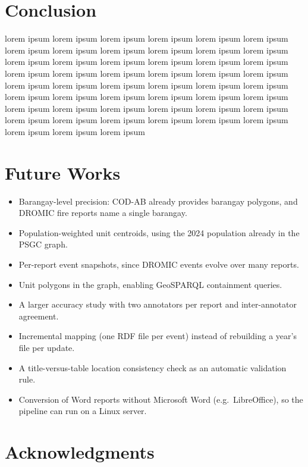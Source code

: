 \documentclass[acmtog]{acmart}
\begin{document}
\section{Conclusion}

lorem ipsum  lorem ipsum  lorem ipsum  lorem ipsum  lorem ipsum  lorem ipsum  lorem ipsum  lorem ipsum  lorem ipsum  lorem ipsum  lorem ipsum  lorem ipsum  lorem ipsum  lorem ipsum  lorem ipsum  lorem ipsum  lorem ipsum  lorem ipsum  lorem ipsum  lorem ipsum  lorem ipsum  lorem ipsum  lorem ipsum  lorem ipsum  lorem ipsum  lorem ipsum  lorem ipsum  lorem ipsum  lorem ipsum  lorem ipsum  lorem ipsum  lorem ipsum  lorem ipsum  lorem ipsum  lorem ipsum  lorem ipsum  lorem ipsum  lorem ipsum  lorem ipsum  lorem ipsum  lorem ipsum  lorem ipsum  lorem ipsum  lorem ipsum  lorem ipsum  lorem ipsum  lorem ipsum  lorem ipsum  lorem ipsum  lorem ipsum  lorem ipsum  

\section{Future Works}

\begin{itemize}
\item Barangay-level precision: COD-AB already provides barangay polygons, and DROMIC fire reports
  name a single barangay.
\item Population-weighted unit centroids, using the 2024 population already in the PSGC graph.
\item Per-report event snapshots, since DROMIC events evolve over many reports.
\item Unit polygons in the graph, enabling GeoSPARQL containment queries.
\item A larger accuracy study with two annotators per report and inter-annotator agreement.
\item Incremental mapping (one RDF file per event) instead of rebuilding a year's file per update.
\item A title-versus-table location consistency check as an automatic validation rule.
\item Conversion of Word reports without Microsoft Word (e.g.\ LibreOffice), so the pipeline can
  run on a Linux server.
\end{itemize}

\section{Acknowledgments}
\end{document}
